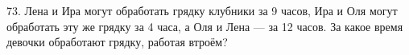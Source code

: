 73. Лена и Ира могут обработать грядку клубники за 9 часов, Ира и Оля могут обработать эту же грядку за 4 часа, а Оля и Лена --- за 12 часов. За какое время девочки обработают грядку, работая втроём?\\
